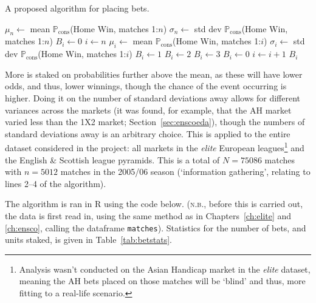\documentclass[a4paper,10pt]{report}
\begin{document}
\begin{algorithm}[h!] %
	\caption{A proposed algorithm for placing bets.}\label{alg:placingbets}
	\begin{algorithmic}[1]
		\State $\mu_{n} \leftarrow$ mean $\mathbb{P}_{\textrm{cons}}$(Home Win, matches 1:$n$) 
		\State $\sigma_{n} \leftarrow$ std dev $\mathbb{P}_{\textrm{cons}}$(Home Win, matches 1:$n$)
		\State $B_{i} \leftarrow 0$ 
		\State $i \leftarrow n$
		\State $\mu_{i} \leftarrow$ mean $\mathbb{P}_{\textrm{cons}}$(Home Win, matches 1:$i$) 
		\State $\sigma_{i} \leftarrow$ std dev $\mathbb{P}_{\textrm{cons}}$(Home Win, matches 1:$i$)
		\State $B_i\leftarrow1$
		\State $B_i\leftarrow2$
		\Else {}
		\State $B_i\leftarrow3$
		\EndIf
		\Else {}
		\State $B_i\leftarrow0$
		\EndIf
		\State $i\leftarrow i+1$ 
		\EndWhile
		\State \Return $B_i$ 
		\EndFunction
	\end{algorithmic}
\end{algorithm}

More is staked on probabilities further above the mean, as these will have lower odds, and thus, lower winnings, though the chance of the event occurring is higher. Doing it on the number of standard deviations away allows for different variances across the markets (it was found, for example, that the AH market varied less than the 1X2 market; Section~\ref{sec:enscoeda}), though the numbers of standard deviations away is an arbitrary choice. This is applied to the entire dataset considered in the project: all markets in the \textit{elite} European leagues\footnote{Analysis wasn't conducted on the Asian Handicap market in the \textit{elite} dataset, meaning the AH bets placed on those matches will be `blind' and thus, more fitting to a real-life scenario.} and the English \& Scottish league pyramids. This is a total of $N = 75086$ matches with $n=5012$ matches in the 2005/06 season (`information gathering', relating to lines 2--4 of the algorithm).

The algorithm is ran in R using the code below. (\textsc{n.b.}, before this is carried out, the data is first read in, using the same method as in Chapters~\ref{ch:elite} and \ref{ch:ensco}, calling the dataframe \lstinline|matches|). Statistics for the number of bets, and units staked, is given in Table~\ref{tab:betstats}.
\end{document}
